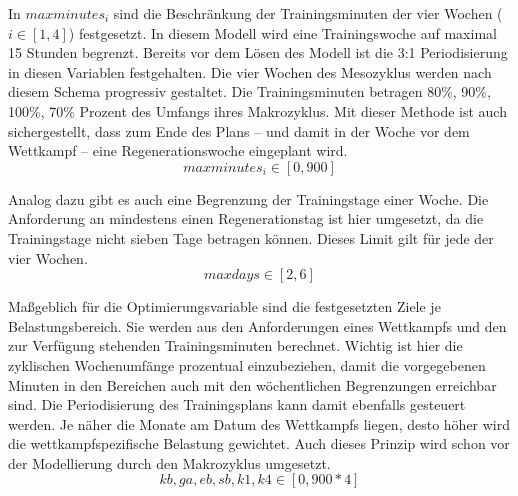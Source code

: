 In $maxminutes_i$ sind die Beschränkung der Trainingsminuten der vier Wochen ($ i \in [ 1, 4]$) festgesetzt. In diesem Modell wird eine Trainingswoche auf maximal 15 Stunden begrenzt. Bereits vor dem Lösen des Modell ist die 3:1 Periodisierung in diesen Variablen festgehalten. Die vier Wochen des Mesozyklus werden nach diesem Schema progressiv gestaltet. Die Trainingsminuten betragen 80\%, 90\%, 100\%, 70\% Prozent des Umfangs ihres Makrozyklus. Mit dieser Methode ist auch sichergestellt, dass zum Ende des Plans -- und damit in der Woche vor dem Wettkampf -- eine Regenerationswoche eingeplant wird.
\begin{equation}
     maxminutes_i \in [0, 900] 
\end{equation}


Analog dazu gibt es auch eine Begrenzung der Trainingstage einer Woche. Die Anforderung an mindestens einen Regenerationstag ist hier umgesetzt, da die Trainingstage nicht sieben Tage betragen können. Dieses Limit gilt für jede der vier Wochen.
\begin{equation}
\label{equation:maxDays}
     maxdays \in [2, 6]
\end{equation}

Maßgeblich für die Optimierungsvariable sind die festgesetzten Ziele je Belastungsbereich. Sie werden aus den Anforderungen eines Wettkampfs und den zur Verfügung stehenden Trainingsminuten berechnet. Wichtig ist hier die zyklischen Wochenumfänge prozentual einzubeziehen, damit die vorgegebenen Minuten in den Bereichen auch mit den wöchentlichen Begrenzungen erreichbar sind.\newline
Die Periodisierung des Trainingsplans kann damit ebenfalls gesteuert werden. Je näher die Monate am Datum des Wettkampfs liegen, desto höher wird die wettkampfspezifische Belastung gewichtet. Auch dieses Prinzip wird schon vor der Modellierung durch den Makrozyklus umgesetzt.
\begin{equation}
    kb, ga, eb, sb, k1, k4 \in [0, 900*4]
\end{equation}

